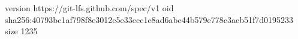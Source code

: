 version https://git-lfs.github.com/spec/v1
oid sha256:40793bc1af798f8e3012c5e33ecc1e8ad6abe44b579e778c3aeb51f7d0195233
size 1235
